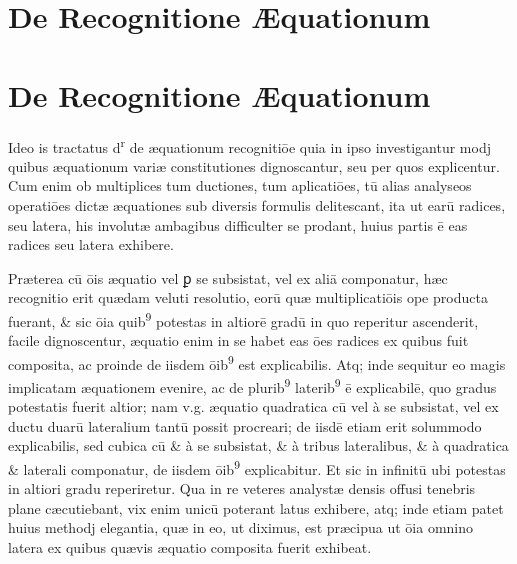 \documentclass[11pt,a4paper]{article}
\begin{document}

\section*{De Recognitione Æquationum}


\section*{De Recognitione Æquationum}

Ideo is tractatus d\textsuperscript{r} de æquationum recognitiōe quia in ipso investigantur modj quibus æquationum variæ constitutiones dignoscantur, seu per quos explicentur. Cum enim ob multiplices tum ductiones, tum aplicatiōes, tū alias analyseos operatiōes dictæ æquationes sub diversis formulis delitescant, ita ut earū radices, seu latera, his involutæ ambagibus difficulter se prodant, huius partis ē eas radices seu latera exhibere.

Præterea cū ōis æquatio vel ꝑ se subsistat, vel ex aliā componatur, hæc recognitio erit quædam veluti resolutio, eorū quæ multiplicatiōis ope producta fuerant, \& sic ōia quib\textsuperscript{9} potestas in altiorē gradū in quo reperitur ascenderit, facile dignoscentur, æquatio enim in se habet eas ōes radices ex quibus fuit composita, ac proinde de iisdem ōib\textsuperscript{9} est explicabilis. Atq; inde sequitur eo magis implicatam æquationem evenire, ac de plurib\textsuperscript{9} laterib\textsuperscript{9} ē explicabilē, quo gradus potestatis fuerit altior; nam v.g. æquatio quadratica cū vel à se subsistat, vel ex ductu duarū lateralium tantū possit procreari; de iisdē etiam erit solummodo explicabilis, sed cubica cū \& à se subsistat, \& à tribus lateralibus, \& à quadratica \& laterali componatur, de iisdem ōib\textsuperscript{9} explicabitur. Et sic in infinitū ubi potestas in altiori gradu reperiretur. Qua in re veteres analystæ densis offusi tenebris plane cæcutiebant, vix enim unicū poterant latus exhibere, atq; inde etiam patet huius methodj elegantia, quæ in eo, ut diximus, est præcipua ut ōia omnino latera ex quibus quævis æquatio composita fuerit exhibeat.
\end{document}
